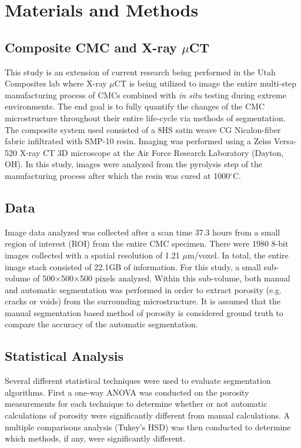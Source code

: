 \documentclass[12pt]{article}
\begin{document}
\section{Materials and Methods}

\subsection{Composite CMC and X-ray $\mu$CT}
This study is an extension of current research being performed in the Utah Composites lab where X-ray $\mu$CT is being utilized to image the entire multi-step manufacturing process of CMCs combined with \textit{in situ} testing during extreme environments. The end goal is to fully quantify the changes of the CMC microstructure throughout their entire life-cycle via methods of segmentation. The composite system used consisted of a 8HS satin weave CG Nicalon-fiber fabric infiltrated with SMP-10 resin. Imaging was performed using a Zeiss Versa-520 X-ray CT 3D microscope at the Air Force Research Laboratory (Dayton, OH). In this study, images were analyzed from the pyrolysis step of the manufacturing process after which the resin was cured at 1000$^{\circ}$C.

\subsection{Data}
Image data analyzed was collected after a scan time 37.3 hours from a small region of interest (ROI) from the entire CMC specimen. There were 1980 8-bit images collected with a spatial resolution of 1.21 $\mu$m/voxel. In total, the entire image stack consisted of 22.1GB of information. For this study, a small sub-volume of 500$\times$500$\times$500 pixels analyzed. Within this sub-volume, both manual and automatic segmentation was performed in order to extract porosity (e.g. cracks or voids) from the surrounding microstructure. It is assumed that the manual segmentation based method of porosity is considered ground truth to compare the accuracy of the automatic segmentation.

\subsection{Statistical Analysis} 
Several different statistical techniques were used to evaluate segmentation algorithms. First a one-way ANOVA was conducted on the porosity measurements for each technique to determine whether or not automatic calculations of porosity were significantly different from manual calculations. A multiple comparisons analysis (Tukey's HSD) was then conducted to determine which methods, if any, were significantly different.\\
\end{document}
